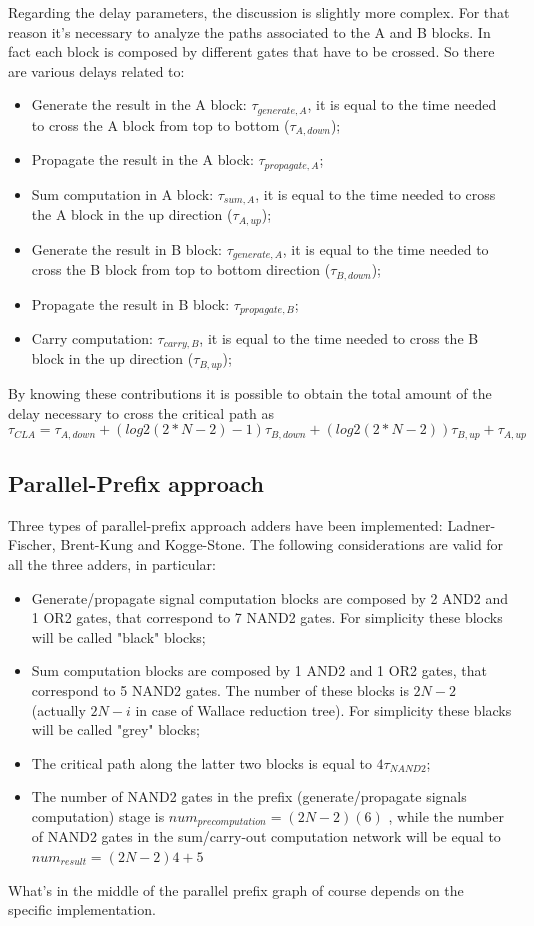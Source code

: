 \documentclass[11pt]{article} %
\begin{document}
Regarding the delay parameters, the discussion is slightly more complex. For that reason it’s necessary to analyze the paths associated to the A and B blocks. In fact each block is composed by different gates that have to be crossed. So there are various delays related to:
\begin{itemize}
\item Generate the result in the A block: $\tau_{generate,A}$, it is equal to the time needed to cross the A block from top to bottom ($\tau_{A,down}$);
\item Propagate the result in the A block: $\tau_{propagate,A}$;
\item Sum computation in A block: $\tau_{sum,A}$, it is equal to the time needed to cross the A block in the up direction ($\tau_{A,up}$);
\item Generate the result in B block: $\tau_{generate,A}$, it is equal to the time needed to cross the B block from top to bottom direction ($\tau_{B,down}$);
\item Propagate the result in B block: $\tau_{propagate,B}$;
\item Carry computation: $\tau_{carry,B}$, it is equal to the time needed to cross the B block in the up direction ($\tau_{B,up}$);
\end{itemize}
By knowing these contributions it is possible to obtain the total amount of the delay necessary to cross the critical path as
$$ \tau_{CLA} = \tau_{A,down} + (log2(2*N-2) - 1) \tau_{B,down} + (log2(2*N-2)) \tau_{B,up} +\tau_{A,up}$$
\vspace{2em}
\subsection{Parallel-Prefix approach}
Three types of parallel-prefix approach adders have been implemented: Ladner-Fischer, Brent-Kung and Kogge-Stone. The following considerations are valid for all the three adders, in particular:
\begin{itemize}
    \item Generate/propagate signal computation blocks are composed by 2 AND2 and 1 OR2 gates, that correspond to 7 NAND2 gates. For simplicity these blocks will be called "black" blocks;
    \item Sum computation blocks are composed by 1 AND2 and 1 OR2 gates, that correspond to 5 NAND2 gates. The number of these blocks is $2 N -2$ (actually $2N-i$ in case of Wallace reduction tree). For simplicity these blacks will be called "grey" blocks;
    \item The critical path along the latter two blocks is equal to $ 4 \tau_{NAND2}$;
    \item The number of NAND2 gates in the prefix (generate/propagate signals computation) stage is $num_{precomputation} = (2N-2)(6)$ , while the number of NAND2 gates in the sum/carry-out computation network will be equal to $num_{result}= (2N-2)4 + 5$
\end{itemize}
What's in the middle of the parallel prefix graph of course depends on the specific implementation.
\vspace{2em}
\end{document}
